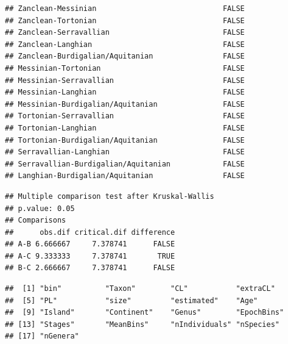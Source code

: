 \documentclass[]{article}
\begin{document}
\begin{verbatim}
## Zanclean-Messinian                             FALSE
## Zanclean-Tortonian                             FALSE
## Zanclean-Serravallian                          FALSE
## Zanclean-Langhian                              FALSE
## Zanclean-Burdigalian/Aquitanian                FALSE
## Messinian-Tortonian                            FALSE
## Messinian-Serravallian                         FALSE
## Messinian-Langhian                             FALSE
## Messinian-Burdigalian/Aquitanian               FALSE
## Tortonian-Serravallian                         FALSE
## Tortonian-Langhian                             FALSE
## Tortonian-Burdigalian/Aquitanian               FALSE
## Serravallian-Langhian                          FALSE
## Serravallian-Burdigalian/Aquitanian            FALSE
## Langhian-Burdigalian/Aquitanian                FALSE
\end{verbatim}

\begin{verbatim}
## Multiple comparison test after Kruskal-Wallis 
## p.value: 0.05 
## Comparisons
##      obs.dif critical.dif difference
## A-B 6.666667     7.378741      FALSE
## A-C 9.333333     7.378741       TRUE
## B-C 2.666667     7.378741      FALSE
\end{verbatim}

\begin{verbatim}
##  [1] "bin"          "Taxon"        "CL"           "extraCL"     
##  [5] "PL"           "size"         "estimated"    "Age"         
##  [9] "Island"       "Continent"    "Genus"        "EpochBins"   
## [13] "Stages"       "MeanBins"     "nIndividuals" "nSpecies"    
## [17] "nGenera"
\end{verbatim}
\end{document}
